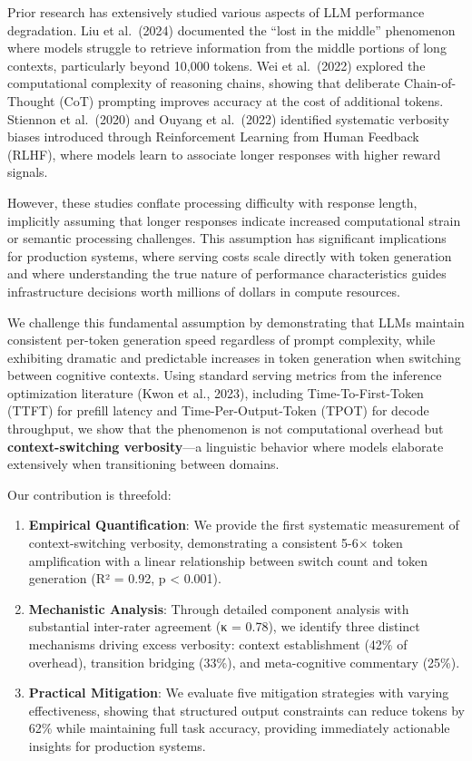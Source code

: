 \documentclass[
  11pt]{article}
\begin{document}
Prior research has extensively studied various aspects of LLM
performance degradation. Liu et al.~(2024) documented the ``lost in the
middle'' phenomenon where models struggle to retrieve information from
the middle portions of long contexts, particularly beyond 10,000 tokens.
Wei et al.~(2022) explored the computational complexity of reasoning
chains, showing that deliberate Chain-of-Thought (CoT) prompting
improves accuracy at the cost of additional tokens. Stiennon et
al.~(2020) and Ouyang et al.~(2022) identified systematic verbosity
biases introduced through Reinforcement Learning from Human Feedback
(RLHF), where models learn to associate longer responses with higher
reward signals.

However, these studies conflate processing difficulty with response
length, implicitly assuming that longer responses indicate increased
computational strain or semantic processing challenges. This assumption
has significant implications for production systems, where serving costs
scale directly with token generation and where understanding the true
nature of performance characteristics guides infrastructure decisions
worth millions of dollars in compute resources.

We challenge this fundamental assumption by demonstrating that LLMs
maintain consistent per-token generation speed regardless of prompt
complexity, while exhibiting dramatic and predictable increases in token
generation when switching between cognitive contexts. Using standard
serving metrics from the inference optimization literature (Kwon et al.,
2023), including Time-To-First-Token (TTFT) for prefill latency and
Time-Per-Output-Token (TPOT) for decode throughput, we show that the
phenomenon is not computational overhead but \textbf{context-switching
verbosity}---a linguistic behavior where models elaborate extensively
when transitioning between domains.

Our contribution is threefold:

\begin{enumerate}
\def\labelenumi{\arabic{enumi}.}
\item
  \textbf{Empirical Quantification}: We provide the first systematic
  measurement of context-switching verbosity, demonstrating a consistent
  5-6× token amplification with a linear relationship between switch
  count and token generation (R² = 0.92, p \textless{} 0.001).
\item
  \textbf{Mechanistic Analysis}: Through detailed component analysis
  with substantial inter-rater agreement (κ = 0.78), we identify three
  distinct mechanisms driving excess verbosity: context establishment
  (42\% of overhead), transition bridging (33\%), and meta-cognitive
  commentary (25\%).
\item
  \textbf{Practical Mitigation}: We evaluate five mitigation strategies
  with varying effectiveness, showing that structured output constraints
  can reduce tokens by 62\% while maintaining full task accuracy,
  providing immediately actionable insights for production systems.
\end{enumerate}
\end{document}
